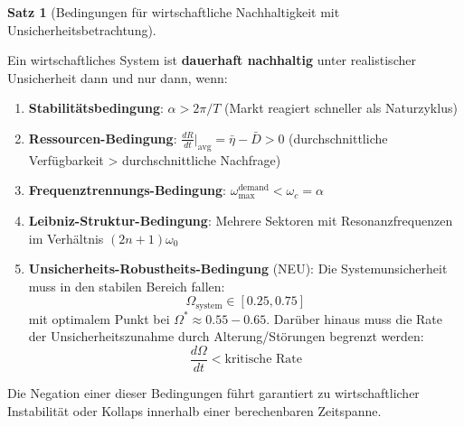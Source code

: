 \documentclass[a4paper, 12pt, twoside, openright]{report}
\theoremstyle{definition}
\theoremstyle{definition}
\newtheorem{satz}{Satz}[chapter]
\begin{document}
\begin{satz}[Bedingungen für wirtschaftliche Nachhaltigkeit mit Unsicherheitsbetrachtung]
\label{satz:nachhaltigkeit_erweitert}

Ein wirtschaftliches System ist \textbf{dauerhaft nachhaltig} unter realistischer Unsicherheit dann und nur dann, wenn:

\begin{enumerate}
    \item \textbf{Stabilitätsbedingung}: $\alpha > 2\pi/T$ (Markt reagiert schneller als Naturzyklus)
    
    \item \textbf{Ressourcen-Bedingung}: $\frac{dR}{dt}\bigg|_{\text{avg}} = \bar{\eta} - \bar{D} > 0$ (durchschnittliche Verfügbarkeit > durchschnittliche Nachfrage)
    
    \item \textbf{Frequenztrennungs-Bedingung}: $\omega_{\max}^{\text{demand}} < \omega_c = \alpha$
    
    \item \textbf{Leibniz-Struktur-Bedingung}: Mehrere Sektoren mit Resonanzfrequenzen im Verhältnis $(2n+1)\omega_0$
    
    \item \textbf{Unsicherheits-Robustheits-Bedingung} (NEU): Die Systemunsicherheit muss in den stabilen Bereich fallen:
    \begin{equation}
    \Omega_{\text{system}} \in [0.25, 0.75]
    \end{equation}
    mit optimalem Punkt bei $\Omega^* \approx 0.55-0.65$. Darüber hinaus muss die Rate der Unsicherheitszunahme durch Alterung/Störungen begrenzt werden:
    \begin{equation}
    \frac{d\Omega}{dt} < \text{kritische Rate}
    \end{equation}
\end{enumerate}

Die Negation einer dieser Bedingungen führt garantiert zu wirtschaftlicher Instabilität oder Kollaps innerhalb einer berechenbaren Zeitspanne.

\end{satz}
\end{document}
